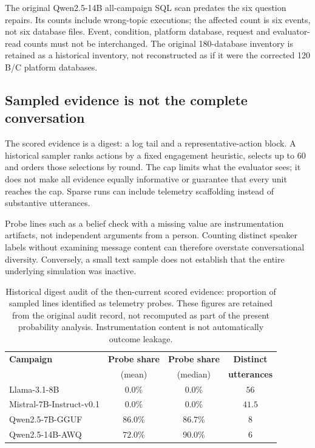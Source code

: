 The original Qwen2.5-14B all-campaign SQL scan predates the six question repairs. Its counts include wrong-topic executions; the affected count is six events, not six database files. Event, condition, platform database, request and evaluator-read counts must not be interchanged. The original 180-database inventory is retained as a historical inventory, not reconstructed as if it were the corrected 120 B/C platform databases.

\subsection{Sampled evidence is not the complete conversation}
\label{sec:evidence_depth}
The scored evidence is a digest: a log tail and a representative-action block. A historical sampler ranks actions by a fixed engagement heuristic, selects up to 60 and orders those selections by round. The cap limits what the evaluator sees; it does not make all evidence equally informative or guarantee that every unit reaches the cap. Sparse runs can include telemetry scaffolding instead of substantive utterances.

Probe lines such as a belief check with a missing value are instrumentation artifacts, not independent arguments from a person. Counting distinct speaker labels without examining message content can therefore overstate conversational diversity. Conversely, a small text sample does not establish that the entire underlying simulation was inactive.
\begin{table}[!htbp]
\centering
\caption{Historical digest audit of the then-current scored evidence: proportion of sampled lines identified as telemetry probes. These figures are retained from the original audit record, not recomputed as part of the present probability analysis. Instrumentation content is not automatically outcome leakage.}
\label{tab:probe_share}
\small
\begin{tabular}{lccc}
\toprule
\textbf{Campaign} & \textbf{Probe share} & \textbf{Probe share} & \textbf{Distinct} \\
 & (mean) & (median) & \textbf{utterances} \\
\midrule
Llama-3.1-8B             & $0.0\%$          & $0.0\%$          & $56$ \\
Mistral-7B-Instruct-v0.1 & $0.0\%$          & $0.0\%$          & $41.5$ \\
Qwen2.5-7B-GGUF          & $\mathbf{86.0\%}$ & $\mathbf{86.7\%}$ & $8$ \\
Qwen2.5-14B-AWQ          & $\mathbf{72.0\%}$ & $\mathbf{90.0\%}$ & $6$ \\
\bottomrule
\end{tabular}
\end{table}

